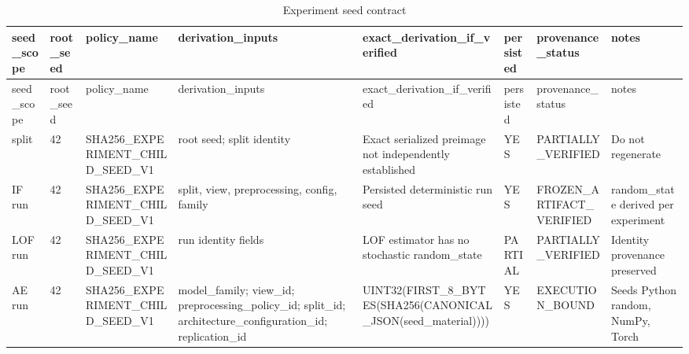 \begin{longtable}{llllllll}
\caption{Experiment seed contract}\\
\toprule
seed\_scope & root\_seed & policy\_name & derivation\_inputs & exact\_derivation\_if\_verified & persisted & provenance\_status & notes \\
\midrule
\endfirsthead
\toprule
seed\_scope & root\_seed & policy\_name & derivation\_inputs & exact\_derivation\_if\_verified & persisted & provenance\_status & notes \\
\midrule
\endhead
split & 42 & SHA256\_EXPERIMENT\_CHILD\_SEED\_V1 & root seed; split identity & Exact serialized preimage not independently established & YES & PARTIALLY\_VERIFIED & Do not regenerate \\
IF run & 42 & SHA256\_EXPERIMENT\_CHILD\_SEED\_V1 & split, view, preprocessing, config, family & Persisted deterministic run seed & YES & FROZEN\_ARTIFACT\_VERIFIED & random\_state derived per experiment \\
LOF run & 42 & SHA256\_EXPERIMENT\_CHILD\_SEED\_V1 & run identity fields & LOF estimator has no stochastic random\_state & PARTIAL & PARTIALLY\_VERIFIED & Identity provenance preserved \\
AE run & 42 & SHA256\_EXPERIMENT\_CHILD\_SEED\_V1 & model\_family; view\_id; preprocessing\_policy\_id; split\_id; architecture\_configuration\_id; replication\_id & UINT32(FIRST\_8\_BYTES(SHA256(CANONICAL\_JSON(seed\_material)))) & YES & EXECUTION\_BOUND & Seeds Python random, NumPy, Torch \\
\bottomrule
\end{longtable}
